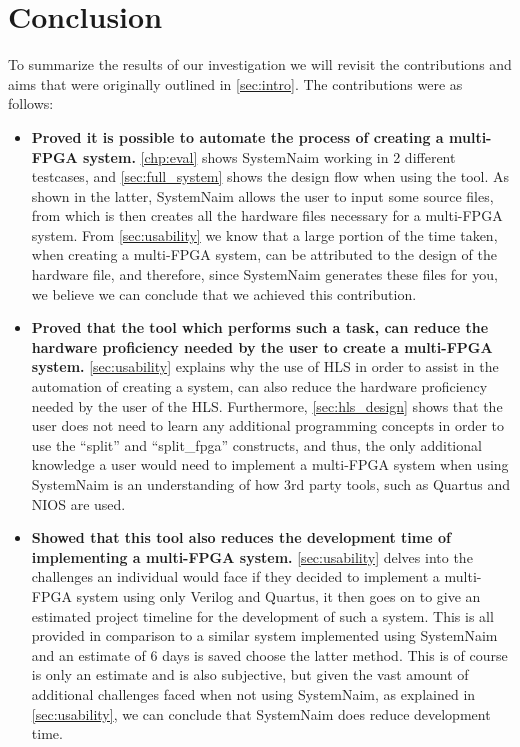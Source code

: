 \chapter{Conclusion}

To summarize the results of our investigation we will revisit the contributions and aims that were originally outlined in \autoref{sec:intro}. The contributions were as follows:

\begin{itemize}
    \item \textbf{Proved it is possible to automate the process of creating a multi-FPGA system.} \autoref{chp:eval} shows SystemNaim working in 2 different testcases, and \autoref{sec:full_system} shows the design flow when using the tool. As shown in the latter, SystemNaim allows the user to input some source files, from which is then creates all the hardware files necessary for a multi-FPGA system. From \autoref{sec:usability} we know that a large portion of the time taken, when creating a multi-FPGA system, can be attributed to the design of the hardware file, and therefore, since SystemNaim generates these files for you, we believe we can conclude that we achieved this contribution.
    \item \textbf{Proved that the tool which performs such a task, can reduce the hardware proficiency needed by the user to create a multi-FPGA system.} \autoref{sec:usability} explains why the use of HLS in order to assist in the automation of creating a system, can also reduce the hardware proficiency needed by the user of the HLS. Furthermore, \autoref{sec:hls_design} shows that the user does not need to learn any additional programming concepts in order to use the “split” and “split\_fpga” constructs, and thus, the only additional knowledge a user would need to implement a multi-FPGA system when using SystemNaim is an understanding of how 3rd party tools, such as Quartus and NIOS are used.
    \item \textbf{Showed that this tool also reduces the development time of implementing a multi-FPGA system.} \autoref{sec:usability} delves into the challenges an individual would face if they decided to implement a multi-FPGA system using only Verilog and Quartus, it then goes on to give an estimated project timeline for the development of such a system. This is all provided in comparison to a similar system implemented using SystemNaim and an estimate of 6 days is saved choose the latter method. This is of course is only an estimate and is also subjective, but given the vast amount of additional challenges faced when not using SystemNaim, as explained in \autoref{sec:usability}, we can conclude that SystemNaim does reduce development time.

\end{itemize}
